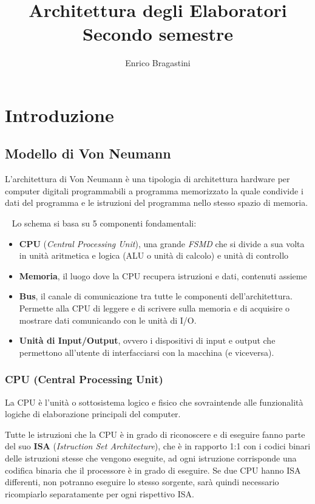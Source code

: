 \documentclass[12pt,oneside]{book}
\title{\Large{\textbf{Architettura degli Elaboratori}} \\ Secondo semestre}
\author{Enrico Bragastini}
\date{}
\begin{document}
\pagestyle{fancy}
\fancyhf{}
\rhead{}
\lhead{\nouppercase\leftmark}
\cfoot{\thepage}
\frontmatter

\maketitle
\tableofcontents

\mainmatter
\chapter{Introduzione}
\section{Modello di Von Neumann}
L'architettura di Von Neumann è una tipologia di architettura hardware per computer digitali programmabili
a programma memorizzato la quale condivide i dati del programma e le istruzioni del programma nello stesso spazio di memoria.

~\newline
Lo schema si basa su 5 componenti fondamentali:
\begin{itemize}
    \item \textbf{CPU} (\emph{Central Processing Unit}), una grande \emph{FSMD} che si divide a sua volta in unità aritmetica
          e logica (ALU o unità di calcolo) e unità di controllo
    \item \textbf{Memoria}, il luogo dove la CPU recupera istruzioni e dati, contenuti assieme
    \item \textbf{Bus}, il canale di comunicazione tra tutte le componenti dell'architettura. Permette alla CPU di leggere e di scrivere sulla memoria e
          di acquisire o mostrare dati comunicando con le unità di I/O.
    \item \textbf{Unità di Input/Output}, ovvero i dispositivi di input e output che permettono all'utente di interfacciarsi con la macchina (e viceversa).
\end{itemize}

\subsection{CPU (Central Processing Unit)}
La CPU è l'unità o sottosistema logico e fisico che sovraintende alle funzionalità logiche di elaborazione principali del computer.

Tutte le istruzioni che la CPU è in grado di riconoscere e di eseguire fanno parte del suo \textbf{ISA} (\emph{Istruction Set Architecture}), che è in
rapporto 1:1 con i codici binari delle istruzioni stesse che vengono eseguite, ad ogni istruzione corrisponde una codifica binaria che il processore
è in grado di eseguire. Se due CPU hanno ISA differenti, non potranno eseguire lo stesso sorgente, sarà quindi necessario ricompiarlo separatamente per ogni rispettivo ISA.
\end{document}
